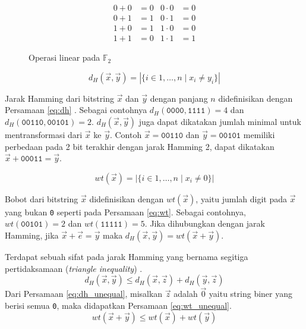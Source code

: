 \begin{figure}
\centering
\begin{align*}
0 + 0 &= 0 & 0 \cdot 0 &= 0 \\
0 + 1 &= 1 & 0 \cdot 1 &= 0 \\
1 + 0 &= 1 & 1 \cdot 0 &= 0 \\
1 + 1 &= 0 & 1 \cdot 1 &= 1
\end{align*}
\caption{Operasi linear pada $\mathbb{F}_2$}
\label{fig:algebra}
\end{figure}

\begin{equation} \label{eq:dh}
d_H(\vec{x},\vec{y}) = |\{i \in {1,\ldots,n} \mid x_i \neq y_i\}|
\end{equation}

Jarak Hamming dari bitstring $\vec{x}$ dan $\vec{y}$ dengan panjang $n$ didefinisikan dengan Persamaan \ref{eq:dh} \cite{Cicalese2000}. Sebagai contohnya $d_H(\texttt{0000},\texttt{1111})= 4$ dan $d_H(\texttt{00110},\texttt{00101})= 2$. $d_H(\vec{x},\vec{y})$ juga dapat dikatakan jumlah minimal untuk mentransformasi dari $\vec{x}$ ke $\vec{y}$. Contoh $\vec{x}=\texttt{00110}$ dan $\vec{y}=\texttt{00101}$ memiliki perbedaan pada 2 bit terakhir dengan jarak Hamming 2, dapat dikatakan $\vec{x}+\texttt{00011} = \vec{y}$.

\begin{equation} \label{eq:wt}
wt(\vec{x}) = |\{i \in {1,\ldots,n} \mid x_i \neq 0\}|
\end{equation}

Bobot dari bitstring $\vec{x}$ didefinisikan dengan $wt(\vec{x})$, yaitu jumlah digit pada $\vec{x}$ yang bukan \texttt{0} seperti pada Persamaan \ref{eq:wt}. Sebagai contohnya, $wt(\texttt{00101}) = 2$ dan $wt(\texttt{11111}) = 5$. Jika dihubungkan dengan jarak Hamming, jika $\vec{x}+\vec{e} = \vec{y}$ maka $d_H(\vec{x},\vec{y}) = wt(\vec{x}+\vec{y})$.

Terdapat sebuah sifat pada jarak Hamming yang bernama segitiga pertidaksamaan (\textit{triangle inequality}) \cite{VanLint2016}.
\begin{equation} \label{eq:dh_unequal}
d_H(\vec{x},\vec{y}) \le d_H(\vec{x},\vec{z}) + d_H(\vec{y},\vec{z})
\end{equation}
Dari Persamaan \ref{eq:dh_unequal}, misalkan $\vec{z}$ adalah $\vec{0}$ yaitu string biner yang berisi semua \texttt{0}, maka didapatkan Persamaan \ref{eq:wt_unequal}.
\begin{equation} \label{eq:wt_unequal}
wt(\vec{x}+\vec{y}) \le wt(\vec{x}) + wt(\vec{y})
\end{equation}


